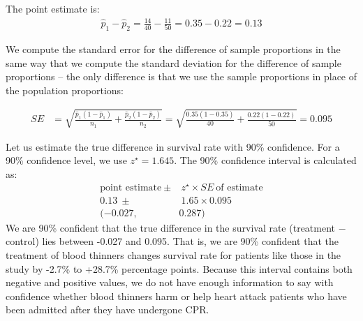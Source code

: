 The point estimate is:
  \begin{align*}
  \hat{p}_{1} - \hat{p}_{2}
    = \frac{14}{40} - \frac{11}{50}
    = 0.35 - 0.22
    = 0.13
  \end{align*}

\D{\newpage}

We compute the standard error for the difference of sample proportions in the same way that we compute the standard deviation for the difference of sample proportions --  the only difference is that we use the sample proportions in place of the population proportions:

\begin{align*}
SE &= \sqrt{\frac{\hat{p}_1(1-\hat{p}_1)}{n_1} + \frac{\hat{p}_2(1-\hat{p}_2)}{n_2}}= \sqrt{\frac{0.35 (1 - 0.35)}{40} +
      \frac{0.22 (1 - 0.22)}{50}}
    = 0.095
  \end{align*}

Let us estimate the true difference in survival rate with 90\% confidence.  For a 90\% confidence level, we use $z^{\star} = 1.645$.  The 90\% confidence interval is calculated as:
  \begin{align*}
  \text{point estimate} \ \pm&\ z^{\star} \times SE\ \text{of estimate}\\
     0.13 \ \pm&\ 1.65\times 0.095\\
 (-0.027,\ & 0.287)
  \end{align*}
We are 90\% confident that the true difference in the survival rate (treatment $-$ control) lies between -0.027 and 0.095.  That is, we are 90\% confident that the treatment of blood thinners changes survival rate for patients like those in the study by -2.7\% to +28.7\% percentage points.  Because this interval contains both negative and positive values, we do not have enough information to say
  with confidence whether blood thinners harm or help
  heart attack patients who have been admitted after
  they have undergone CPR.






